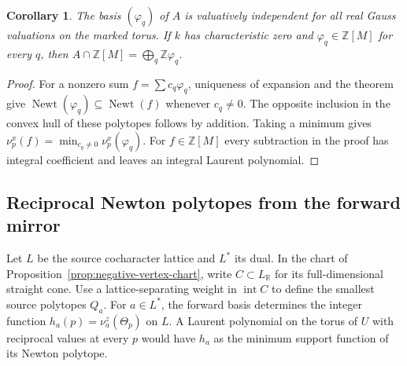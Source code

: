 \documentclass[11pt,reqno]{amsart}
\numberwithin{equation}{section}
\newtheorem{corollary}[theorem]{Corollary}
\theoremstyle{definition}
\theoremstyle{remark}
\DeclareMathOperator{\Newt}{Newt}
\begin{document}
\begin{corollary}\label{cor:return-independence}
The basis \((\varphi_q)\) of \(A\) is valuatively independent for all real Gauss
valuations on the marked torus. If \(k\) has characteristic zero and
\(\varphi_q\in\mathbb Z[M]\) for every \(q\), then
\(A\cap\mathbb Z[M]=\bigoplus_q\mathbb Z\varphi_q\).
\end{corollary}
\begin{proof}
For a nonzero sum \(f=\sum c_q\varphi_q\), uniqueness of expansion
and the theorem give \(\Newt(\varphi_q)\subseteq\Newt(f)\) whenever \(c_q\ne0\). The opposite inclusion
in the convex hull of these polytopes follows by addition. Taking a
minimum gives \(\nu^x_p(f)=\min_{c_q\ne0}\nu^x_p(\varphi_q)\).
For \(f\in\mathbb Z[M]\) every subtraction in the proof has integral
coefficient and leaves an integral Laurent polynomial.
\end{proof}

\subsection{Reciprocal Newton polytopes from the forward mirror}
\label{subsec:one-sided-polytopes}

Let \(L\) be the source cocharacter lattice and \(L^*\) its dual. In
the chart of Proposition~\ref{prop:negative-vertex-chart}, write
\(C\subset L_{\mathbb R}\) for its full-dimensional straight cone.
Use a lattice-separating weight in \(\operatorname{int}C\) to define
the smallest source polytopes \(Q_a\). For \(a\in L^*\), the forward
basis determines the integer function
\(h_a(p)=\nu^z_a(\Theta_p)\) on \(L\). A Laurent polynomial on the torus of \(U\)
with reciprocal values at every \(p\) would have \(h_a\) as the
minimum support function of its Newton polytope.
\end{document}

